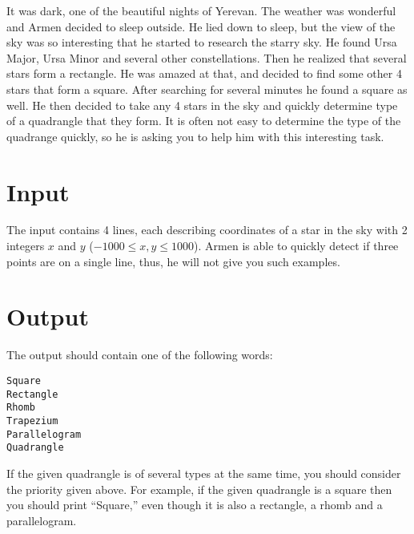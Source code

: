 
It was dark, one of the beautiful nights of Yerevan.
The weather was wonderful and Armen decided to sleep outside.
He lied down to sleep, but the view of the sky was so interesting that he started to research the starry sky.
He found Ursa Major, Ursa Minor and several other constellations.
Then he realized that several stars form a rectangle.
He was amazed at that, and decided to find some other 4 stars that form a square.
After searching for several minutes he found a square as well.
He then decided to take any 4 stars in the sky and quickly determine type of a quadrangle that they form.
It is often not easy to determine the type of the quadrange quickly, so he is asking you to help him with this interesting task.

\section*{Input}
The input contains 4 lines, each describing coordinates of a star in the sky with 2 integers $x$ and $y$ ($-1000 \leq x, y \leq 1000$).
Armen is able to quickly detect if three points are on a single line, thus, he will not give you such examples.

\section*{Output}
The output should contain one of the following words:
    \begin{center}
        \texttt{Square \\
        Rectangle \\
        Rhomb \\
        Trapezium \\
        Parallelogram \\
        Quadrangle}
    \end{center}
If the given quadrangle is of several types at the same time, you should consider the priority given above.
For example, if the given quadrangle is a square then you should print ``Square,'' even though it is also a rectangle, a rhomb and a parallelogram.
